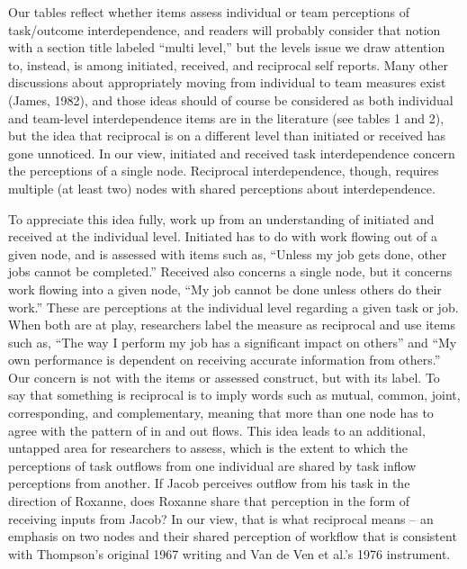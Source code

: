 \documentclass[english,,man]{apa6}
\theoremstyle{definition}
\theoremstyle{definition}
\theoremstyle{definition}
\theoremstyle{remark}
\begin{document}
Our tables reflect whether items assess individual or team perceptions
of task/outcome interdependence, and readers will probably consider that
notion with a section title labeled \enquote{multi level,} but the
levels issue we draw attention to, instead, is among initiated,
received, and reciprocal self reports. Many other discussions about
appropriately moving from individual to team measures exist (James,
1982), and those ideas should of course be considered as both individual
and team-level interdependence items are in the literature (see tables 1
and 2), but the idea that reciprocal is on a different level than
initiated or received has gone unnoticed. In our view, initiated and
received task interdependence concern the perceptions of a single node.
Reciprocal interdependence, though, requires multiple (at least two)
nodes with shared perceptions about interdependence.

To appreciate this idea fully, work up from an understanding of
initiated and received at the individual level. Initiated has to do with
work flowing out of a given node, and is assessed with items such as,
\enquote{Unless my job gets done, other jobs cannot be completed.}
Received also concerns a single node, but it concerns work flowing into
a given node, \enquote{My job cannot be done unless others do their
work.} These are perceptions at the individual level regarding a given
task or job. When both are at play, researchers label the measure as
reciprocal and use items such as, \enquote{The way I perform my job has
a significant impact on others} and \enquote{My own performance is
dependent on receiving accurate information from others.} Our concern is
not with the items or assessed construct, but with its label. To say
that something is reciprocal is to imply words such as mutual, common,
joint, corresponding, and complementary, meaning that more than one node
has to agree with the pattern of in and out flows. This idea leads to an
additional, untapped area for researchers to assess, which is the extent
to which the perceptions of task outflows from one individual are shared
by task inflow perceptions from another. If Jacob perceives outflow from
his task in the direction of Roxanne, does Roxanne share that perception
in the form of receiving inputs from Jacob? In our view, that is what
reciprocal means -- an emphasis on two nodes and their shared perception
of workflow that is consistent with Thompson's original 1967 writing and
Van de Ven et al.'s 1976 instrument.
\end{document}
